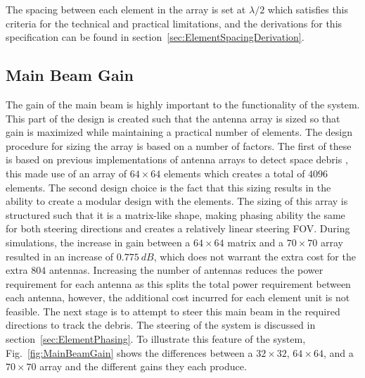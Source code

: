 \documentclass[11pt]{witseiepaper}
\begin{document}
\begin{bibunit}[witseie]
The spacing between each element in the array is set at $\lambda/2$ which satisfies this criteria for the technical and practical limitations, and the derivations for this specification can be found in section~\ref{sec:ElementSpacingDerivation}.

\subsection{Main Beam Gain} \label{sec:MainBeamGain}
The gain of the main beam is highly important to the functionality of the system. This part of the design is created such that the antenna array is sized so that gain is maximized while maintaining a practical number of elements.
The design procedure for sizing the array is based on a number of factors. The first of these is based on previous implementations of antenna arrays to detect space debris \cite{AMISR}, this made use of an array of $64 \times 64$ elements which creates a total of $4096$ elements.
The second design choice is the fact that this sizing results in the ability to create a modular design with the elements. The sizing of this array is structured such that it is a matrix-like shape, making phasing ability the same for both steering directions and creates a relatively linear steering FOV.
During simulations, the increase in gain between a $64 \times 64$ matrix and a $70 \times 70$ array resulted in an increase of $0.775~dB$, which does not warrant the extra cost for the extra $804$ antennas.
Increasing the number of antennas reduces the power requirement for each antenna as this splits the total power requirement between each antenna, however, the additional cost incurred for each element unit is not feasible.
The next stage is to attempt to steer this main beam in the required directions to track the debris. The steering of the system is discussed in section~\ref{sec:ElementPhasing}.
To illustrate this feature of the system, Fig.~\ref{fig:MainBeamGain} shows the differences between a $32 \times 32$, $64 \times 64$, and a $70 \times 70$ array and the different gains they each produce.


\end{bibunit}
\end{document}
